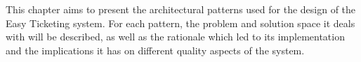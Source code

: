 This chapter aims to present the architectural patterns used for the design of the Easy Ticketing system. For each pattern, the problem and solution space it deals with will be described, as well as the rationale which led to its implementation and the implications it has on different quality aspects of the system.


\label{subchp:layers}



\label{sybchp:mvc}


\label{subchp:observerP}


\label{subchp:replicatedP}


\label{subchp:trustedP}



\label{subchp:MS-Replication}





\label{subchp:DataRep}
